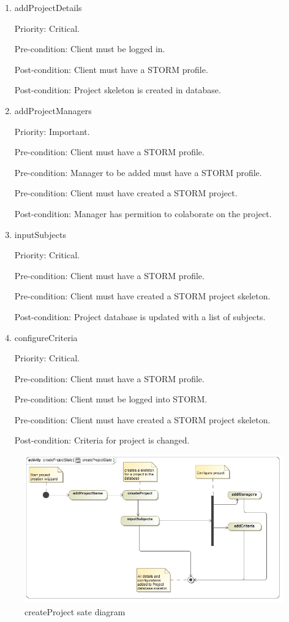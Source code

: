 \begin{enumerate}
\item addProjectDetails\par
Priority: Critical.\par
Pre-condition: Client must be logged in.\par
Post-condition: Client must have a STORM profile.\par
Post-condition: Project skeleton is created in database.\par
\item addProjectManagers\par
Priority: Important.\par
Pre-condition: Client must have a STORM profile.\par
Pre-condition: Manager to be added must have a STORM profile.\par
Pre-condition: Client must have created a STORM project.\par
Post-condition: Manager has permition to colaborate on the project.\par
\item inputSubjects\par
Priority: Critical.\par
Pre-condition: Client must have a STORM profile.\par
Pre-condition: Client must have created a STORM project skeleton.\par
Post-condition: Project database is updated with a list of subjects.\par
\item configureCriteria\par
Priority: Critical.\par
Pre-condition: Client must have a STORM profile.\par
Pre-condition: Client must be logged into STORM.\par
Pre-condition: Client must have created a STORM project skeleton.\par
Post-condition: Criteria for project is changed.\par
\end{enumerate}
\begin{figure}[h]
    \centering
    \includegraphics[width=15cm]{./graphics/createProjectState.jpg}
    \caption{createProject sate diagram}
    \label{fig:createProject_state}
\end{figure}